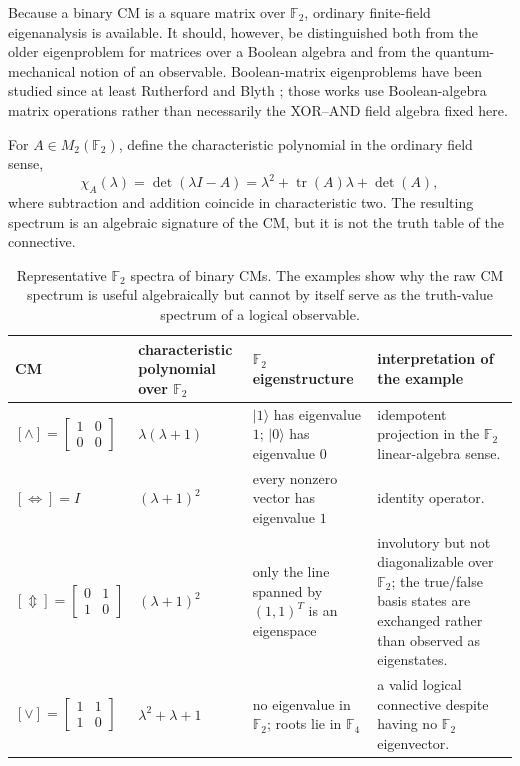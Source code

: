 \documentclass[11pt]{article}
\theoremstyle{definition}
\theoremstyle{remark}
\newcommand{\F}{\mathbb F}
\begin{document}
Because a binary CM is a square matrix over $\F_2$, ordinary finite-field eigenanalysis is available.  It should, however, be distinguished both from the older eigenproblem for matrices over a Boolean algebra and from the quantum-mechanical notion of an observable.  Boolean-matrix eigenproblems have been studied since at least Rutherford and Blyth \cite{Rutherford1965,Blyth1967}; those works use Boolean-algebra matrix operations rather than necessarily the XOR--AND field algebra fixed here.

For $A\in M_2(\F_2)$, define the characteristic polynomial in the ordinary field sense,
\[
 \chi_A(\lambda)=\det(\lambda I-A)
 =\lambda^2+\operatorname{tr}(A)\lambda+\det(A),
\]
where subtraction and addition coincide in characteristic two.  The resulting spectrum is an algebraic signature of the CM, but it is not the truth table of the connective.

\begin{table}[ht]
\centering
\small
\begin{tabular}{L{0.14\textwidth}L{0.18\textwidth}L{0.22\textwidth}L{0.34\textwidth}}
\toprule
CM & characteristic polynomial over $\F_2$ & $\F_2$ eigenstructure & interpretation of the example \\
\midrule
$[\land]=\left[\begin{smallmatrix}1&0\\0&0\end{smallmatrix}\right]$
& $\lambda(\lambda+1)$
& $|1\rangle$ has eigenvalue $1$; $|0\rangle$ has eigenvalue $0$
& idempotent projection in the $\F_2$ linear-algebra sense.\\
$[\Leftrightarrow]=I$
& $(\lambda+1)^2$
& every nonzero vector has eigenvalue $1$
& identity operator.\\
$[\Updownarrow]=\left[\begin{smallmatrix}0&1\\1&0\end{smallmatrix}\right]$
& $(\lambda+1)^2$
& only the line spanned by $(1,1)^T$ is an eigenspace
& involutory but not diagonalizable over $\F_2$; the true/false basis states are exchanged rather than observed as eigenstates.\\
$[\lor]=\left[\begin{smallmatrix}1&1\\1&0\end{smallmatrix}\right]$
& $\lambda^2+\lambda+1$
& no eigenvalue in $\F_2$; roots lie in $\F_4$
& a valid logical connective despite having no $\F_2$ eigenvector.\\
\bottomrule
\end{tabular}
\caption{Representative $\F_2$ spectra of binary CMs.  The examples show why the raw CM spectrum is useful algebraically but cannot by itself serve as the truth-value spectrum of a logical observable.}
\label{tab:cmspectrum}
\end{table}
\end{document}
